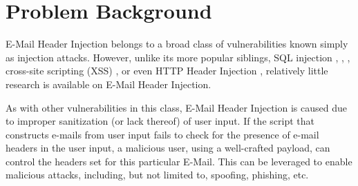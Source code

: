 \section{Problem Background}

E-Mail Header Injection belongs to a broad class of vulnerabilities known simply as injection attacks. However, unlike its more popular siblings, SQL injection \cite{sql1}, \cite{sql0}, \cite{sql2}, cross-site scripting (XSS) \cite{Injection1}, \cite{KleinAmit} or even HTTP Header Injection \cite{sessionride}, relatively little research is available on E-Mail Header Injection.

As with other vulnerabilities in this class, E-Mail Header Injection is caused due to improper sanitization (or lack thereof) of user input. If the script that constructs e-mails from user input fails to check for the presence of e-mail headers in the user input, a malicious user, using a well-crafted payload, can control the headers set for this particular E-Mail. This can be leveraged to enable malicious attacks, including, but not limited to, spoofing, phishing, etc.